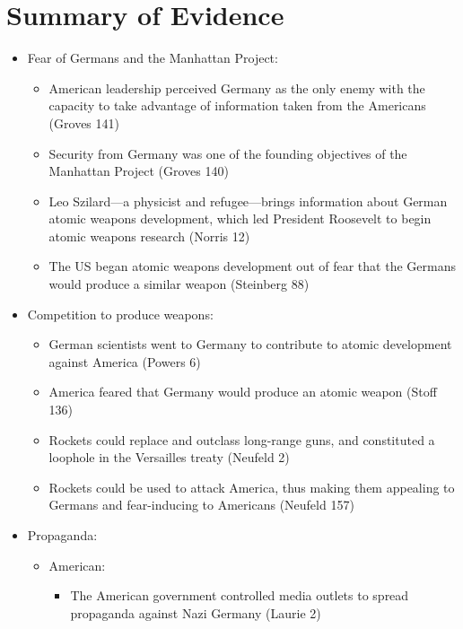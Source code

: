 \documentclass[a4paper,12pt]{article}
\begin{document}
    \section{Summary of Evidence}
        \begin{itemize}
            \item Fear of Germans and the Manhattan Project:
            \begin{itemize}
                \item American leadership perceived Germany as the only enemy with the capacity to take advantage of information taken from the Americans (Groves 141)
                \item Security from Germany was one of the founding objectives of the Manhattan Project (Groves 140)
                \item Leo Szilard---a physicist and refugee---brings information about German atomic weapons development, which led President Roosevelt to begin  atomic weapons research (Norris 12)
                \item The US began atomic weapons development out of fear that the Germans would produce a similar weapon (Steinberg 88)
            \end{itemize}
            \item Competition to produce weapons:
            \begin{itemize}
                \item German scientists went to Germany to contribute to atomic development against America (Powers 6)
                \item America feared that Germany would produce an atomic weapon (Stoff 136)
                \item Rockets could replace and outclass long-range guns, and constituted a loophole in the Versailles treaty (Neufeld 2)
                \item Rockets could be used to attack America, thus making them appealing to Germans and fear-inducing to Americans (Neufeld 157)
            \end{itemize}
            \item Propaganda:
            \begin{itemize}
                \item American:
                \begin{itemize}
                    \item The American government controlled media outlets to spread propaganda against Nazi Germany (Laurie 2)

\end{itemize}
\end{itemize}
\end{itemize}
\end{document}
